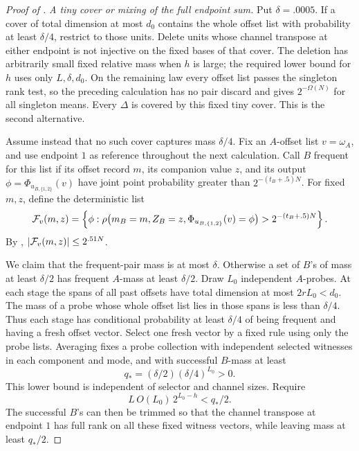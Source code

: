 \begin{proof}[Proof of ]
\medskip\noindent
\emph{A tiny cover or mixing of the full endpoint sum.}
Put \(\delta=.0005\).  If a cover of total dimension at most
\(d_0\) contains the whole offset list with probability at least
\(\delta/4\), restrict to those units.  Delete units whose
channel transpose at either endpoint is not injective on the
fixed bases of that cover.  The deletion has arbitrarily small
fixed relative mass when \(h\) is large; the required lower
bound for \(h\) uses only \(L,\delta,d_0\).  On the remaining law
every offset list passes the singleton rank test, so the
preceding calculation has no pair discard and gives
\(2^{-\Omega(N)}\) for all singleton means.  Every \(\Delta\)
is covered by this fixed tiny cover.  This is the second
alternative.

Assume instead that no such cover captures mass \(\delta/4\).
Fix an \(A\)-offset list \(v=\omega_A\), and use endpoint \(1\)
as reference throughout the next calculation.  Call \(B\)
frequent for this list if its offset record \(m\), its companion
value \(z\), and its output \(\phi=\Phi_{u_{B,\{1,2\}}}(v)\)
have joint point probability greater than
\(2^{-(t_B+.5)N}\).  For fixed \(m,z\), define the deterministic
list
\begin{equation}
 {\cal F}_v(m,z)=
 \left\{\phi:
  \rho\bigl(m_B=m,Z_B=z,
       \Phi_{u_{B,\{1,2\}}}(v)=\phi\bigr)
       >2^{-(t_B+.5)N}\right\}.
 \label{eq:frequent-list}
\end{equation}
By ,
\(\lvert {\cal F}_v(m,z)\rvert\le2^{.51N}\).

We claim that the frequent-pair mass is at most \(\delta\).
Otherwise a set of \(B\)'s of mass at least \(\delta/2\) has
frequent \(A\)-mass at least \(\delta/2\).  Draw \(L_0\)
independent \(A\)-probes.  At each stage the spans of all past
offsets have total dimension at most \(2rL_0<d_0\).  The mass
of a probe whose whole offset list lies in those spans is
less than \(\delta/4\).  Thus each stage has conditional
probability at least \(\delta/4\) of being frequent and having
a fresh offset vector.  Select one fresh vector by a fixed
rule using only the probe lists.  Averaging fixes a probe
collection with independent selected witnesses in each
component and mode, and with successful \(B\)-mass at least
\begin{equation}
 q_*=(\delta/2)(\delta/4)^{L_0}>0.
 \label{eq:fresh-probe-mass}
\end{equation}
This lower bound is independent of selector and channel sizes.
Require
\begin{equation}
 L\,O(L_0)\,2^{L_0-h}<q_*/2.
 \label{eq:early-h-probes}
\end{equation}
The successful \(B\)'s can then be trimmed so that the channel
transpose at endpoint \(1\) has full rank on all these fixed
witness vectors, while leaving mass at least \(q_*/2\).


\end{proof}
